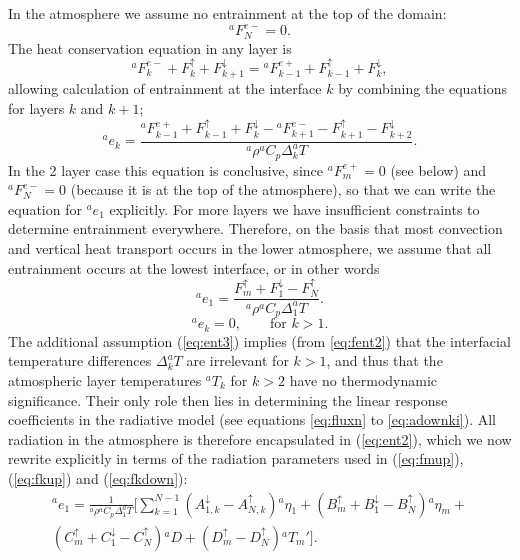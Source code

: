\documentclass[11pt, a4paper,twoside]{article}
\newcommand{\dt}[2]{\Delta_{#2}^{#1}T}
\newcommand{\etb}[2]{{{}^{#1}\eta_{#2}}}
\newcommand{\rhb}[1]{{{}^{#1}\rho}}
\newcommand{\cp}[1]{{{}^{#1}C_p}}
\newcommand{\e}[2]{{{}^{#1}e_{#2}}}
\newcommand{\T}[2]{{{}^{#1}T_{#2}}}
\newcommand{\aup}[1]{A^{\uparrow}_{#1}}
\newcommand{\adown}[1]{A^{\downarrow}_{#1}}
\newcommand{\bup}[1]{B^{\uparrow}_{#1}}
\newcommand{\cupp}[1]{C^{\uparrow}_{#1}}
\newcommand{\bdown}[1]{B^{\downarrow}_{#1}}
\newcommand{\cdown}[1]{C^{\downarrow}_{#1}}
\newcommand{\dup}[1]{D^{\uparrow}_{#1}}
\newcommand{\F}[3]{{{}^{#1}F^{#3}_{#2}}}
\newcommand{\Fup}[1]{{F^{\uparrow}_{#1}}}
\newcommand{\Fdown}[1]{{F^{\downarrow}_{#1}}}
\newcommand{\D}[1]{{}^{#1}D}
\numberwithin{equation}{section}
\begin{document}
In the atmosphere we assume no entrainment at the top of the domain:
\begin{equation}
\F{a}{N}{e-} = 0.
\end{equation}
The heat conservation equation in any layer is
\begin{equation}
\F{a}{k}{e-} + \Fup{k} +\Fdown{k+1} = \F{a}{k-1}{e+} + \Fup{k-1}+  \Fdown{k} ,
\end{equation}
allowing calculation of entrainment at the interface $k$ by combining the equations for layers $k$ and $k+1$;
\begin{equation}\label{eq:ent1}
\e{a}{k}  = \frac{\F{a}{k-1}{e+} + \Fup{k-1}+ \Fdown{k}  - \F{a}{k+1}{e-} -\Fup{k+1}  - \Fdown{k+2} }{\rhb{a} \cp{a} \dt{a}{k} }.
\end{equation}
In the 2 layer case this equation is conclusive, since $\F{a}{m}{e+}=0$ (see below) and $\F{a}{N}{e-}=0$ (because it is at the top of the atmosphere), so that we can write the equation for $\e{a}{1}$ explicitly.
For more layers we have insufficient constraints to determine entrainment everywhere.
Therefore, on the basis that most convection and vertical heat transport occurs in the lower atmosphere, we assume that all entrainment occurs at the lowest interface, or in other words
\begin{equation}\label{eq:ent2}
\e{a}{1}  = \frac{\Fup{m}+ \Fdown{1}   -\Fup{N}   }{\rhb{a} \cp{a} \dt{a}{1} }.
\end{equation}
\begin{equation}\label{eq:ent3}
\e{a}{k}  = 0, \quad\quad \textrm{for } k > 1.
\end{equation}
The additional assumption (\ref{eq:ent3}) implies (from \ref{eq:fent2}) that the
interfacial temperature differences $\dt{a}{k}$ are irrelevant for $k > 1$, and thus that the atmospheric layer temperatures $\T{a}{k}$ for $k > 2$ have no thermodynamic significance. 
Their only role then lies in determining the linear response coefficients
in the radiative model (see equations \ref{eq:fluxn} to \ref{eq:adownki}).
All radiation in the atmosphere is therefore encapsulated in (\ref{eq:ent2}), which we now rewrite explicitly in terms of the radiation parameters used in (\ref{eq:fmup}), (\ref{eq:fkup}) and (\ref{eq:fkdown}):
\begin{multline}\label{eq:ent4}
\e{a}{1}  = \frac{1}{\rhb{a} \cp{a} \dt{a}{1} }\biggl[\sum_{k=1}^{N-1}\left(\adown{1,k} - \aup{N,k}\right) \etb{a}{1} + \left(\bup{m} + \bdown{1} - \bup{N} \right) \etb{a}{m} +\\
 \left( \cupp{m} + \cdown{1}  - \cupp{N} \right) \D{a} + \left(\dup{m} - \dup{N}\right) \T{a}{m}'  \biggr] .
\end{multline}
\end{document}
